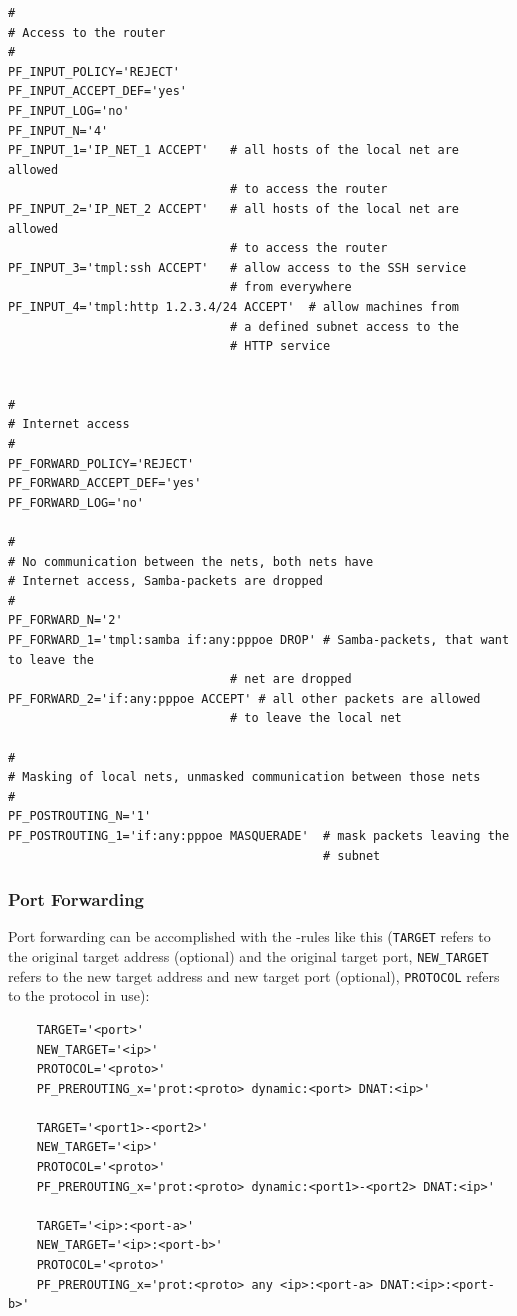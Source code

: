 \begin{example}
\begin{verbatim}
#
# Access to the router
#
PF_INPUT_POLICY='REJECT'
PF_INPUT_ACCEPT_DEF='yes'
PF_INPUT_LOG='no'
PF_INPUT_N='4'
PF_INPUT_1='IP_NET_1 ACCEPT'   # all hosts of the local net are allowed
                               # to access the router
PF_INPUT_2='IP_NET_2 ACCEPT'   # all hosts of the local net are allowed
                               # to access the router
PF_INPUT_3='tmpl:ssh ACCEPT'   # allow access to the SSH service
                               # from everywhere
PF_INPUT_4='tmpl:http 1.2.3.4/24 ACCEPT'  # allow machines from
                               # a defined subnet access to the
                               # HTTP service


#
# Internet access
#
PF_FORWARD_POLICY='REJECT'
PF_FORWARD_ACCEPT_DEF='yes'
PF_FORWARD_LOG='no'

#
# No communication between the nets, both nets have
# Internet access, Samba-packets are dropped
#
PF_FORWARD_N='2'
PF_FORWARD_1='tmpl:samba if:any:pppoe DROP' # Samba-packets, that want to leave the
                               # net are dropped
PF_FORWARD_2='if:any:pppoe ACCEPT' # all other packets are allowed
                               # to leave the local net

#
# Masking of local nets, unmasked communication between those nets
#
PF_POSTROUTING_N='1'
PF_POSTROUTING_1='if:any:pppoe MASQUERADE'  # mask packets leaving the
                                            # subnet
\end{verbatim}
\end{example}

\subsubsection{Port Forwarding}

Port forwarding can be accomplished with the -rules like
this (\verb+TARGET+ refers to the original target address (optional) and
the original target port, \verb+NEW_TARGET+ refers to the new target address
and new target port (optional), \verb+PROTOCOL+ refers to the protocol in use):

\begin{example}
\begin{verbatim}
    TARGET='<port>'
    NEW_TARGET='<ip>'
    PROTOCOL='<proto>'
    PF_PREROUTING_x='prot:<proto> dynamic:<port> DNAT:<ip>'

    TARGET='<port1>-<port2>'
    NEW_TARGET='<ip>'
    PROTOCOL='<proto>'
    PF_PREROUTING_x='prot:<proto> dynamic:<port1>-<port2> DNAT:<ip>'

    TARGET='<ip>:<port-a>'
    NEW_TARGET='<ip>:<port-b>'
    PROTOCOL='<proto>'
    PF_PREROUTING_x='prot:<proto> any <ip>:<port-a> DNAT:<ip>:<port-b>'
\end{verbatim}
\end{example}

